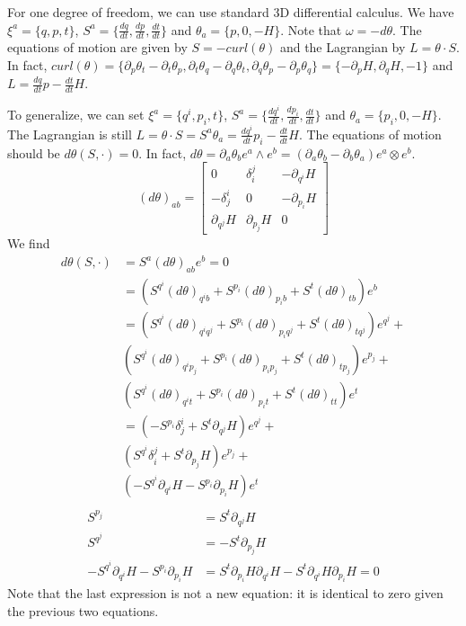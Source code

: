 \documentclass[11pt,letterpaper,fleqn]{memoir} %
\begin{document}
For one degree of freedom, we can use standard 3D differential calculus. We have $\xi^a=\{q,p,t\}$, $S^a=\{\frac{dq}{dt},\frac{dp}{dt},\frac{dt}{dt}\}$ and $\theta_a=\{p,0,-H\}$. Note that $\omega = -d \theta$. The equations of motion are given by $S=-curl(\theta)$ and the Lagrangian by $L=\theta \cdot S$. In fact, $curl(\theta)=\{\partial_p \theta_t - \partial_t \theta_p, \partial_t \theta_q - \partial_q \theta_t, \partial_q \theta_p - \partial_p \theta_q\} = \{ -\partial_p H , \partial_q H , - 1 \}$ and $L = \frac{dq}{dt}p - \frac{dt}{dt}H$.

To generalize, we can set $\xi^a=\{q^i,p_i,t\}$, $S^a=\{\frac{dq^i}{dt},\frac{dp_i}{dt},\frac{dt}{dt}\}$ and $\theta_a=\{p_i,0,-H\}$. The Lagrangian is still $L=\theta \cdot S = S^a \theta_a = \frac{dq^i}{dt}p_i - \frac{dt}{dt}H$. The equations of motion should be $d\theta(S, \cdot ) = 0$. In fact, $d\theta = \partial_a \theta_b e^a \wedge e^b = (\partial_a \theta_b - \partial_b \theta_a) e^a \otimes e^b$.
\begin{equation*}
(d\theta)_{ab} = \begin{bmatrix}
0 & \delta^j_i & - \partial_{q^i} H \\
-\delta^i_j & 0 & - \partial_{p_i} H \\
\partial_{q^j} H & \partial_{p_j} H & 0
\end{bmatrix}
\end{equation*}
We find
\begin{align*}
d\theta(S, \cdot )  &= S^a (d\theta)_{ab} e^b = 0 \\
&= (S^{q^i}(d\theta)_{q^ib} + S^{p_i}(d\theta)_{p_ib} + S^{t}(d\theta)_{tb}) e^b \\
&= (S^{q^i}(d\theta)_{q^iq^j} + S^{p_i}(d\theta)_{p_iq^j} + S^{t}(d\theta)_{tq^j}) e^{q^j} + \\
& (S^{q^i}(d\theta)_{q^ip_j} +  S^{p_i}(d\theta)_{p_ip_j} + S^{t}(d\theta)_{tp_j}) e^{p_j} + \\
& (S^{q^i}(d\theta)_{q^it} + S^{p_i}(d\theta)_{p_it} + S^{t}(d\theta)_{tt}) e^t \\
&= (-S^{p_i}\delta^i_j + S^{t}\partial_{q^j} H ) e^{q^j} + \\
& (S^{q^i}\delta^j_i +  S^{t}\partial_{p_j} H) e^{p_j} + \\
& (-S^{q^i} \partial_{q^i} H - S^{p_i} \partial_{p_i} H) e^t \\
\end{align*}
\begin{align*}
S^{p_j} &= S^{t} \partial_{q^j} H \\
S^{q^j} &= - S^{t}\partial_{p_j} H \\
-S^{q^i} \partial_{q^i} H - S^{p_i} \partial_{p_i} H &= S^{t}\partial_{p_i} H \partial_{q^i} H - S^{t} \partial_{q^i} H \partial_{p_i} H = 0
\end{align*}
Note that the last expression is not a new equation: it is identical to zero given the previous two equations.
\end{document}

